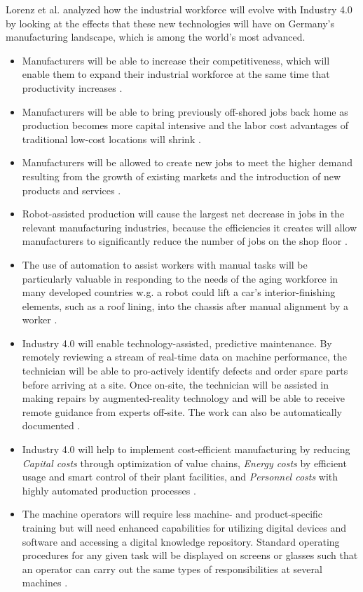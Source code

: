 Lorenz et al. \cite{MANMACHINE} analyzed how the industrial workforce will evolve with Industry 4.0 by looking at the effects that these new technologies will have on Germany’s manufacturing landscape, which is among the world’s most advanced. 
\begin{itemize}
\item Manufacturers will be able to increase their competitiveness, which will enable them to expand their industrial workforce at the same time that productivity increases \cite{MANMACHINE,IN4BCG}.
\item Manufacturers will be able to bring previously off-shored jobs back home as production becomes more capital intensive and the labor cost advantages of traditional low-cost locations will shrink \cite{MANMACHINE}.
\item Manufacturers will be allowed to create new jobs to meet the higher demand resulting from the growth of existing markets and the introduction of new products and services \cite{IN4BCG,INDUSINTERNET,MANMACHINE}.
\item Robot-assisted production will cause the largest net decrease in jobs in the relevant manufacturing industries, because the efficiencies it creates will allow manufacturers to significantly reduce the number of jobs on the shop floor \cite{MANMACHINE}.
\item The use of automation to assist workers with manual tasks will be particularly valuable in responding to the needs of the aging workforce in many developed countries w.g. a robot could lift a car’s interior-finishing elements, such as a roof lining, into the chassis after manual alignment by a worker \cite{MANMACHINE}.
\item Industry 4.0 will enable technology-assisted, predictive maintenance. By remotely reviewing a stream of real-time data on machine performance, the technician will be able to pro-actively identify defects and order spare parts before arriving at a site. Once on-site, the technician will be assisted in making repairs by augmented-reality technology and will be able to receive remote guidance from experts off-site. The work can also be automatically documented \cite{MANMACHINE}.
\item Industry 4.0 will help to implement cost-efficient manufacturing by reducing \textit{Capital costs} through optimization of value chains, \textit{Energy costs} by efficient usage and smart control of their plant facilities, and \textit{Personnel costs} with highly automated production processes \cite{DBHENG}.
\item The machine operators will require less machine- and product-specific training but will need enhanced capabilities for utilizing digital devices and software and accessing a digital knowledge repository. Standard operating procedures for any given task will be displayed on screens or glasses such that an operator can carry out the same types of responsibilities at several machines \cite{MANMACHINE}.
\end{itemize}
